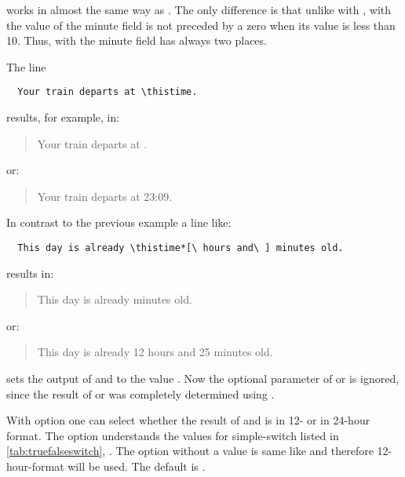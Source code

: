  works in almost the same way as .
The only difference is that unlike with , with
 the value of the minute field is not preceded by a
zero when its value is less than 10. Thus, with  the
minute field has always two places.
\begin{Example}
  The line
\begin{lstlisting}
  Your train departs at \thistime.
\end{lstlisting}
  results, for example, in:
  \begin{quote}
    Your train departs at \thistime.
  \end{quote}
  or:
  \begin{quote}
    Your train departs at 23:09.
  \end{quote}
  \bigskip
  In contrast to the previous example a line like:
\begin{lstlisting}
  This day is already \thistime*[\ hours and\ ] minutes old.
\end{lstlisting}
  results in:
  \begin{quote}
    This day is already  minutes old.
  \end{quote}
  or:
  \begin{quote}
    This day is already 12 hours and 25 minutes old.
  \end{quote}
\end{Example}

\begin{Declaration}%
\end{Declaration}%
%
 sets the output of  and
 to the value .  Now the optional
parameter of  or  is ignored, since
the result of  or  was completely
determined using .%

\begin{Declaration}
\end{Declaration}%
%
%
With option  one can select
whether the result of  and  is in 12- or in
24-hour format. The option understands the values for simple-switch listed in
\autoref{tab:truefalseswitch}, . The option
without a value is same like  and therefore
12-hour-format will be used. The default is .

